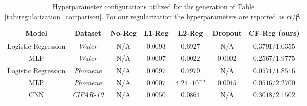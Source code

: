 \begin{table*}[htb!]
    \centering
    \caption{Hyperparameter configurations utilized for the generation of Table \ref{tab:regularization_comparison}. For our regularization the hyperparameters are reported as $\mathbf{\alpha/\beta}$.}
    \label{tab:performance_parameters}
    \begin{tabular}{|c|c|c|c|c|c|c|}
        \hline
        \textbf{Model} & \textbf{Dataset} & \textbf{No-Reg} & \textbf{L1-Reg} & \textbf{L2-Reg} & \textbf{Dropout} & \textbf{CF-Reg (ours)} \\ \hline
        Logistic Regression   & \textit{Water}   & N/A   & $0.0093$   & $0.6927$  & N/A    & $0.3791/1.0355$                     \\ \hline
        MLP   & \textit{Water}   & N/A   & $0.0007$   & $0.0022$  & $0.0002$    & $0.2567/1.9775$                    \\ \hline
        Logistic Regression   &
        \textit{Phomene}   & N/A   & $0.0097$   & $0.7979$  & N/A    & $0.0571/1.8516$                     \\ \hline
        MLP   & \textit{Phomene}   & N/A   & $0.0007$   & $4.24\cdot10^{-5}$  & $0.0015$    & $0.0516/2.2700$                    \\ \hline
        CNN   & \textit{CIFAR-10} & N/A   & $0.0050$   & $0.0864$ & N/A    & $0.3018/
        2.1502$                     \\ \hline
    \end{tabular}
\end{table*}

